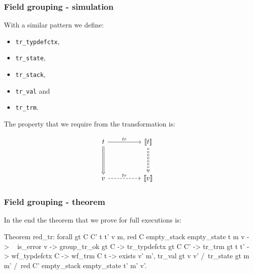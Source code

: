 \begin{frame}[fragile]
\frametitle{Field grouping - simulation}

With a similar pattern we define:
\\[0.5em]
\begin{minipage}{0.45\linewidth}
\begin{itemize}
	\item \texttt{tr\_typdefctx},
	\item \texttt{tr\_state},
	\item \texttt{tr\_stack},
\end{itemize}
\end{minipage}%
\begin{minipage}{0.45\linewidth}
\begin{itemize}
	\item \texttt{tr\_val} and
	\item \texttt{tr\_trm}.
\end{itemize}
\end{minipage}

\bigskip

The property that we require from the transformation is:

\begin{equation*}
\begin{tikzcd}[row sep=huge, column sep=huge]
t \arrow[r,"tr"] \arrow[d, Rightarrow] & \llbracket t \rrbracket \arrow[d, Rightarrow, dashed]
\\
v \arrow[r,"tr",dashed] & \llbracket v \rrbracket
\end{tikzcd}
\end{equation*}

\end{frame}


\begin{frame}[fragile]
\frametitle{Field grouping - theorem}

In the end the theorem that we prove for full executions is:

\begin{coq}
  Theorem red_tr: forall gt C C' t t' v m,
    red C empty_stack empty_state t m v ->
    ~ is_error v ->
    group_tr_ok gt C ->
    tr_typdefctx gt C C' ->
    tr_trm gt t t' ->
    wf_typdefctx C ->
    wf_trm C t ->
    exists v' m',		tr_val gt v v'
	  	   /\ tr_state gt m m'
		   /\ red C' empty_stack empty_state t' m' v'.
\end{coq}

\end{frame}


